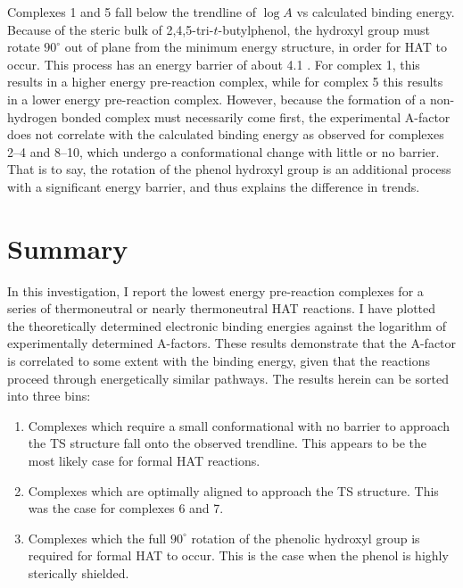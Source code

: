 

Complexes 1 and 5 fall below the trendline of $\log A$ vs calculated binding energy. Because of the steric bulk of 2,4,5-tri-$t$-butylphenol, the hydroxyl group must rotate $90^\circ$ out of plane from the minimum energy structure,  in order for HAT to occur. This process has an energy barrier of about 4.1 \kcalmol. For complex 1, this results in a higher energy pre-reaction complex, while for complex 5 this results in a lower energy pre-reaction complex. However, because the formation of a non-hydrogen bonded complex must necessarily come first, the experimental A-factor does not correlate with the calculated binding energy as observed for complexes 2--4 and 8--10, which undergo a conformational change with little or no barrier. That is to say, the rotation of the phenol hydroxyl group is an additional process with a significant energy barrier, and thus explains the difference in trends.

\section{Summary}

In this investigation, I report the lowest energy pre-reaction complexes for a series of thermoneutral or nearly thermoneutral HAT reactions. I have plotted the theoretically determined electronic binding energies against the logarithm of experimentally determined A-factors. These results demonstrate that the A-factor is correlated to some extent with the binding energy, given that the reactions proceed through energetically similar pathways. The results herein can be sorted into three bins:

\begin{enumerate}
  \item Complexes which require a small conformational with no barrier to approach the TS structure fall onto the observed trendline. This appears to be the most likely case for formal HAT reactions.

  \item Complexes which are optimally aligned to approach the TS structure. This was the case for complexes 6 and 7.

  \item Complexes which the full $90^\circ$ rotation of the phenolic hydroxyl group is required for formal HAT to occur. This is the case when the phenol is highly sterically shielded.
\end{enumerate}

